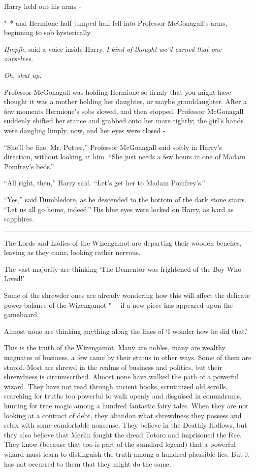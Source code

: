 Harry held out his arms -

"--* and Hermione half-jumped half-fell into Professor McGonagall's arms,
beginning to sob hysterically.

\emph{Hmpfh,} said a voice inside Harry. \emph{I kind of thought we'd
earned that one ourselves.}

\emph{Oh, shut up.}

Professor McGonagall was holding Hermione so firmly that you might have
thought it was a mother holding her daughter, or maybe granddaughter.
After a few moments Hermione's sobs slowed, and then stopped. Professor
McGonagall suddenly shifted her stance and grabbed onto her more
tightly; the girl's hands were dangling limply, now, and her eyes were
closed -

``She'll be fine, Mr. Potter,'' Professor McGonagall said softly in
Harry's direction, without looking at him. ``She just needs a few hours
in one of Madam Pomfrey's beds.''

``All right, then,'' Harry said. ``Let's get her to Madam Pomfrey's.''

``Yes,'' said Dumbledore, as he descended to the bottom of the dark
stone stairs. ``Let us all go home, indeed.'' His blue eyes were locked
on Harry, as hard as sapphires.

\begin{center}\rule{3in}{0.4pt}\end{center}

The Lords and Ladies of the Wizengamot are departing their wooden
benches, leaving as they came, looking rather nervous.

The vast majority are thinking `The Dementor was frightened of the
Boy-Who-Lived!'

Some of the shrewder ones are already wondering how this will affect the
delicate power balance of the Wizengamot "--- if a new piece has appeared
upon the gameboard.

Almost none are thinking anything along the lines of `I wonder how he
did that.'

This is the truth of the Wizengamot: Many are nobles, many are wealthy
magnates of business, a few came by their status in other ways. Some of
them are stupid. Most are shrewd in the realms of business and politics,
but their shrewdness is circumscribed. Almost none have walked the path
of a powerful wizard. They have not read through ancient books,
scrutinized old scrolls, searching for truths too powerful to walk
openly and disguised in conundrums, hunting for true magic among a
hundred fantastic fairy tales. When they are not looking at a contract
of debt, they abandon what shrewdness they possess and relax with some
comfortable nonsense. They believe in the Deathly Hallows, but they also
believe that Merlin fought the dread Totoro and imprisoned the Ree. They
know (because that too is part of the standard legend) that a powerful
wizard must learn to distinguish the truth among a hundred plausible
lies. But it has not occurred to them that they might do the same.

